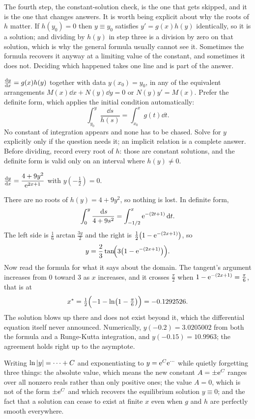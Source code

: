The fourth step, the constant-solution check, is the one that gets skipped, and it is the one that changes answers. It is worth being explicit about why the roots of $h$ matter. If $h(y_0)=0$ then $y\equiv y_0$ satisfies $y'=g(x)h(y)$ identically, so it is a solution; and dividing by $h(y)$ in step three is a division by zero on that solution, which is why the general formula usually cannot see it. Sometimes the formula recovers it anyway at a limiting value of the constant, and sometimes it does not. Deciding which happened takes one line and is part of the answer.

\cue $\frac{\mathrm{d}y}{\mathrm{d}x}=g(x)h(y)$ together with data $y(x_0)=y_0$, in any of the equivalent arrangements $M(x)\dd x+N(y)\dd y=0$ or $N(y)y'=M(x)$.
\method Prefer the definite form, which applies the initial condition automatically:
\[\int_{y_0}^{y}\frac{\dd s}{h(s)}=\int_{x_0}^{x}g(t)\dd t.\]
No constant of integration appears and none has to be chased. Solve for $y$ explicitly only if the question needs it; an implicit relation is a complete answer. Before dividing, record every root of $h$: those are constant solutions, and the definite form is valid only on an interval where $h(y)\neq0$.

\begin{worked}
$\frac{\mathrm{d}y}{\mathrm{d}x}=\dfrac{4+9y^{2}}{\mathrm{e}^{2x+1}}$ with $y(-\tfrac12)=0$.

There are no roots of $h(y)=4+9y^{2}$, so nothing is lost. In definite form,
\[\int_{0}^{y}\frac{\,\mathrm{d} s}{4+9s^{2}}=\int_{-1/2}^{x}\mathrm{e}^{-(2t+1)}\,\mathrm{d} t.\]
The left side is $\tfrac16\arctan\tfrac{3y}{2}$ and the right is $\tfrac12\bigl(1-\mathrm{e}^{-(2x+1)}\bigr)$, so
\[y=\frac23\tan\!\Bigl(3\bigl(1-\mathrm{e}^{-(2x+1)}\bigr)\Bigr).\]
Now read the formula for what it says about the domain. The tangent's argument increases from $0$ toward $3$ as $x$ increases, and it crosses $\tfrac{\pi}{2}$ when $1-\mathrm{e}^{-(2x+1)}=\tfrac{\pi}{6}$, that is at
\[x^{*}=\tfrac12\Bigl(-1-\ln\bigl(1-\tfrac{\pi}{6}\bigr)\Bigr)=-0.1292526.\]
The solution blows up there and does not exist beyond it, which the differential equation itself never announced. Numerically, $y(-0.2)=3.0205002$ from both the formula and a Runge-Kutta integration, and $y(-0.15)=10.9963$; the agreement holds right up to the asymptote.
\end{worked}

\begin{trap}
Writing $\ln\left\lvert y\right\rvert=\cdots+C$ and exponentiating to $y=\mathrm{e}^{C}\mathrm{e}^{\cdots}$ while quietly forgetting three things: the absolute value, which means the new constant $A=\pm\mathrm{e}^{C}$ ranges over all nonzero reals rather than only positive ones; the value $A=0$, which is not of the form $\pm\mathrm{e}^{C}$ and which recovers the equilibrium solution $y\equiv0$; and the fact that a solution can cease to exist at finite $x$ even when $g$ and $h$ are perfectly smooth everywhere.
\end{trap}


